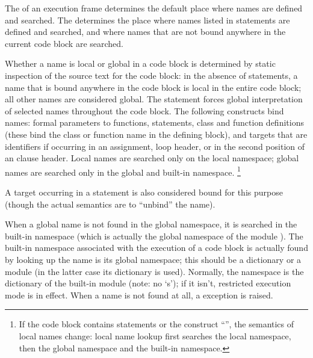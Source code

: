 The  of an execution frame determines the default
place where names are defined and searched.  The  determines the place where names listed in 
statements are defined and searched, and where names that are not
bound anywhere in the current code block are searched.

Whether a name is local or global in a code block is determined by
static inspection of the source text for the code block: in the
absence of  statements, a name that is bound anywhere
in the code block is local in the entire code block; all other names
are considered global.  The  statement forces global
interpretation of selected names throughout the code block.  The
following constructs bind names: formal parameters to functions,
 statements, class and function definitions (these
bind the class or function name in the defining block), and targets
that are identifiers if occurring in an assignment,  loop
header, or in the second position of an  clause
header.  Local names are searched only on the local namespace; global
names are searched only in the global and built-in namespace.%
%
\footnote{If the code block contains  statements or the
construct ``'', the semantics of local
names change: local name lookup first searches the local namespace,
then the global namespace and the built-in namespace.}

A target occurring in a  statement is also considered bound
for this purpose (though the actual semantics are to ``unbind'' the
name).

When a global name is not found in the global namespace, it is
searched in the built-in namespace (which is actually the global
namespace of the module ).  The built-in namespace
associated with the execution of a code block is actually found by
looking up the name  is its global namespace; this
should be a dictionary or a module (in the latter case its dictionary
is used).  Normally, the  namespace is the
dictionary of the built-in module  (note: no `s');
if it isn't, restricted execution mode is in effect.  When a name is
not found at all, a  exception is raised.%

